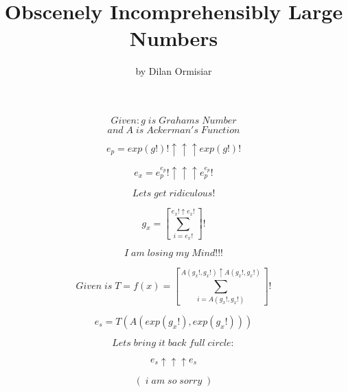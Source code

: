 \documentclass{article}
\title{Obscenely Incomprehensibly Large Numbers}
\author{by Dilan Ormisiar}
\begin{document}
\maketitle
$$
Given: g\;is\;Grahams\;Number
$$
$$
and\;A\;is\;Ackerman's\;Function
$$

$$
e_p = exp(g!)! \uparrow \uparrow \uparrow exp(g!)!
$$

$$
e_x = e_p^{e_p}! \uparrow \uparrow \uparrow e_p^{e_p}!
$$

$$
Lets\;get\;ridiculous! 
$$

$$
g_x = [\sum^{e_x!\uparrow e_x!}_{i = e_x!}]!
$$

$$
I\;am\;losing\;my\;Mind!!!
$$

$$
Given\;is\;T = f(x) = [\sum^{A(g_x!, g_x!)\uparrow A(g_x!, g_x!)}_{i = A(g_x!, g_x!)}]!
$$

$$
e_s = T(A(exp(g_x!), exp(g_x!)))
$$

$$
Lets\;bring\;it\;back\;full\;circle:
$$

$$
e_s \uparrow\uparrow\uparrow e_s
$$

$$
(\;i\;am\;so\;sorry\;)
$$
\end{document}
